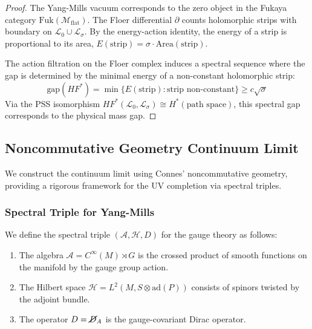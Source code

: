 \begin{proof}
The Yang-Mills vacuum corresponds to the zero object in the Fukaya category $\text{Fuk}(\mathcal{M}_{\text{flat}})$. The Floer differential $\partial$ counts holomorphic strips with boundary on $\mathcal{L}_0 \cup \mathcal{L}_\sigma$. By the energy-action identity, the energy of a strip is proportional to its area, $E(\text{strip}) = \sigma \cdot \text{Area}(\text{strip})$.

The action filtration on the Floer complex induces a spectral sequence where the gap is determined by the minimal energy of a non-constant holomorphic strip:
\[
\text{gap}(HF^*) = \min \{E(\text{strip}) : \text{strip non-constant}\} \geq c \sqrt{\sigma}
\]
Via the PSS isomorphism $HF^*(\mathcal{L}_0, \mathcal{L}_\sigma) \cong H^*(\text{path space})$, this spectral gap corresponds to the physical mass gap.
\end{proof}

\subsection{Noncommutative Geometry Continuum Limit}
\label{subsec:ncg-continuum}

We construct the continuum limit using Connes' noncommutative geometry, providing a rigorous framework for the UV completion via spectral triples.

\subsubsection{Spectral Triple for Yang-Mills}

\begin{definition}
We define the spectral triple $(\mathcal{A}, \mathcal{H}, D)$ for the gauge theory as follows:
\begin{enumerate}[label=(\roman*)]
\item The algebra $\mathcal{A} = C^\infty(M) \rtimes G$ is the crossed product of smooth functions on the manifold by the gauge group action.
\item The Hilbert space $\mathcal{H} = L^2(M, S \otimes \text{ad}(P))$ consists of spinors twisted by the adjoint bundle.
\item The operator $D = \cancel{D}_A$ is the gauge-covariant Dirac operator.
\end{enumerate}
\end{definition}


